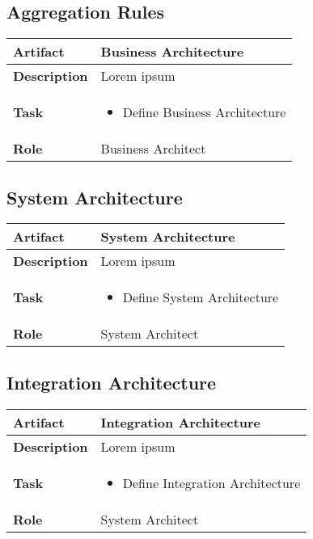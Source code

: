 \subsection{Aggregation Rules}
\begin{minipage}{\textwidth}
 \label{table:ch6_Artifact_Aggregation_Rules}
\begin{tabular}
	{|m{2cm}|m{10cm}|} \hline \bfseries Artifact & Business Architecture\\
	\hline \bfseries Description & Lorem ipsum\\
	\hline \bfseries Task & 
	\begin{itemize}
		\item Define Business Architecture 
	\end{itemize}
	\\
	\hline \bfseries Role & Business Architect\\
	\hline 
\end{tabular}
\end{minipage}

\subsection{System Architecture}
\begin{minipage}{\textwidth}
 \label{table:ch6_Artifact_System_Architecture}
\begin{tabular}
	{|m{2cm}|m{10cm}|} \hline \bfseries Artifact & System Architecture\\
	\hline \bfseries Description & Lorem ipsum\\
	\hline \bfseries Task & 
	\begin{itemize}
		\item Define System Architecture 
	\end{itemize}
	\\
	\hline \bfseries Role & System Architect\\
	\hline 
\end{tabular}
\end{minipage}

\subsection{Integration Architecture}
\begin{minipage}{\textwidth}
 \label{table:ch6_Artifact_Integration_Architecture}
\begin{tabular}
	{|m{2cm}|m{10cm}|} \hline \bfseries Artifact & Integration Architecture\\
	\hline \bfseries Description & Lorem ipsum\\
	\hline \bfseries Task & 
	\begin{itemize}
		\item Define Integration Architecture 
	\end{itemize}
	\\
	\hline \bfseries Role & System Architect\\
	\hline 
\end{tabular}
\end{minipage}

